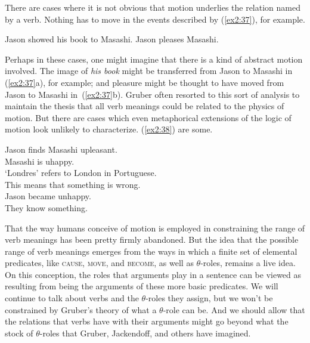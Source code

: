 There are cases where it is not obvious that motion underlies the relation named by a verb. Nothing has to move in the events described by (\ref{ex2:37}), for example.
\begin{exe}
	\ex \label{ex2:37}
	\begin{xlist}
	\ex Jason showed his book to Masashi.
	\ex Jason pleases Masashi.
\end{xlist}
\end{exe}
Perhaps in these cases, one might imagine that there is a kind of abstract motion involved. The image of \emph{his book} might be transferred from Jason to Masashi in (\ref{ex2:37}a), for example; and pleasure might be thought to have moved from Jason to Masashi in~(\ref{ex2:37}b). Gruber often resorted to this sort of analysis to maintain the thesis that all verb meanings could be related to the physics of motion. But there are cases which even metaphorical extensions of the logic of motion look unlikely to characterize. (\ref{ex2:38}) are some.
\begin{exe}
	\ex \label{ex2:38} Jason finds Masashi upleasant.\\ 
			   			Masashi is uhappy.\\
			   			`Londres' refers to London in Portuguese.\\
			   			This means that something is wrong.\\
			   			Jason became unhappy.\\
			   			They know something.
\end{exe}
That the way humans conceive of motion is employed in constraining the range of verb meanings has been pretty firmly abandoned. But the idea that the possible range of verb meanings emerges from the ways in which a finite set of elemental predicates, like \textsc{cause}, \textsc{move}, and \textsc{become}, as well as $\theta$-roles, remains a live idea. %
%
%
%
On this conception, the roles that arguments play in a sentence can be viewed as resulting from being the arguments of these more basic predicates. We will continue to talk about verbs and the \mbox{$\theta$-role}s they assign, but we won't be constrained by Gruber's theory of what a $\theta$-role can be. And we should allow that the relations that verbs have with their arguments might go beyond what the stock of $\theta$-roles that Gruber, Jackendoff, and others have imagined.

